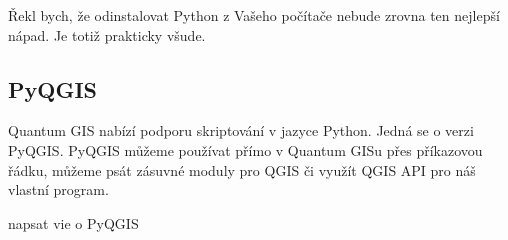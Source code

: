 Řekl bych, že odinstalovat Python z Vašeho počítače nebude zrovna ten nejlepší nápad. Je totiž prakticky všude.

\subsection*{PyQGIS}
Quantum GIS nabízí podporu skriptování v jazyce Python. Jedná se o verzi PyQGIS. PyQGIS můžeme používat přímo v Quantum GISu přes příkazovou řádku, můžeme psát zásuvné moduly pro QGIS či využít QGIS API pro náš vlastní program. 


{\color{red}napsat vie o PyQGIS}







